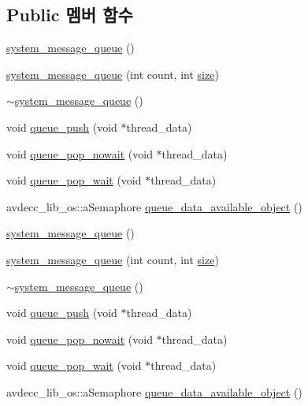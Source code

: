 \subsection*{Public 멤버 함수}
\begin{DoxyCompactItemize}
\item 
\hyperlink{classsystem__message__queue_a570c3bfb13dfc9493424995163d6f2a1}{system\+\_\+message\+\_\+queue} ()
\item 
\hyperlink{classsystem__message__queue_a12b01c8917a72b62fcee713ef50ff21c}{system\+\_\+message\+\_\+queue} (int count, int \hyperlink{gst__avb__playbin_8c_a439227feff9d7f55384e8780cfc2eb82}{size})
\item 
\hyperlink{classsystem__message__queue_a736d5cc4de778e454da59bb5342ea2bf}{$\sim$system\+\_\+message\+\_\+queue} ()
\item 
void \hyperlink{classsystem__message__queue_ab4ac378f6d2de95a8714a7d78e38221f}{queue\+\_\+push} (void $\ast$thread\+\_\+data)
\item 
void \hyperlink{classsystem__message__queue_ae21ddf8c4896fce42973b06c5910b721}{queue\+\_\+pop\+\_\+nowait} (void $\ast$thread\+\_\+data)
\item 
void \hyperlink{classsystem__message__queue_abef38d054d5a7d0035a7b46852557d1b}{queue\+\_\+pop\+\_\+wait} (void $\ast$thread\+\_\+data)
\item 
avdecc\+\_\+lib\+\_\+os\+::a\+Semaphore \hyperlink{classsystem__message__queue_a693e79bfd49557206af670444372e35e}{queue\+\_\+data\+\_\+available\+\_\+object} ()
\item 
\hyperlink{classsystem__message__queue_a570c3bfb13dfc9493424995163d6f2a1}{system\+\_\+message\+\_\+queue} ()
\item 
\hyperlink{classsystem__message__queue_a12b01c8917a72b62fcee713ef50ff21c}{system\+\_\+message\+\_\+queue} (int count, int \hyperlink{gst__avb__playbin_8c_a439227feff9d7f55384e8780cfc2eb82}{size})
\item 
\hyperlink{classsystem__message__queue_a736d5cc4de778e454da59bb5342ea2bf}{$\sim$system\+\_\+message\+\_\+queue} ()
\item 
void \hyperlink{classsystem__message__queue_ab4ac378f6d2de95a8714a7d78e38221f}{queue\+\_\+push} (void $\ast$thread\+\_\+data)
\item 
void \hyperlink{classsystem__message__queue_ae21ddf8c4896fce42973b06c5910b721}{queue\+\_\+pop\+\_\+nowait} (void $\ast$thread\+\_\+data)
\item 
void \hyperlink{classsystem__message__queue_abef38d054d5a7d0035a7b46852557d1b}{queue\+\_\+pop\+\_\+wait} (void $\ast$thread\+\_\+data)
\item 
avdecc\+\_\+lib\+\_\+os\+::a\+Semaphore \hyperlink{classsystem__message__queue_a693e79bfd49557206af670444372e35e}{queue\+\_\+data\+\_\+available\+\_\+object} ()
\end{DoxyCompactItemize}
